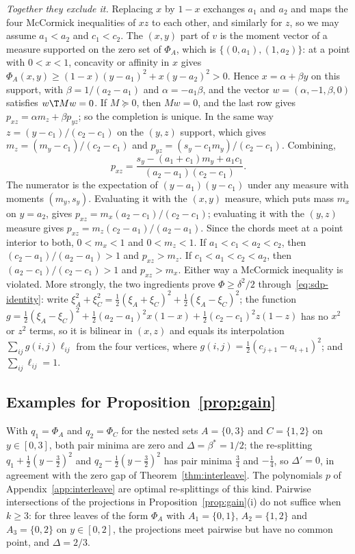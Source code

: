 \emph{Together they exclude it.} Replacing $x$ by $1-x$ exchanges $a_1$ and $a_2$
and maps the four McCormick inequalities of $xz$ to each other, and similarly
for $z$, so we may assume $a_1<a_2$ and $c_1<c_2$. The $(x,y)$ part of $v$ is
the moment vector of a measure supported on the zero set of $\Phi_A$, which is
$\{(0,a_1),(1,a_2)\}$: at a point with $0<x<1$, concavity or affinity in $x$
gives $\Phi_A(x,y)\ge(1-x)(y-a_1)^2+x(y-a_2)^2>0$. Hence $x=\alpha+\beta y$ on this
support, with $\beta=1/(a_2-a_1)$ and $\alpha=-a_1\beta$, and the vector
$w=(\alpha,-1,\beta,0)$ satisfies $w\T Mw=0$. If $M\succeq0$, then $Mw=0$, and the
last row gives $p_{xz}=\alpha m_z+\beta p_{yz}$; so the completion is unique. In
the same way $z=(y-c_1)/(c_2-c_1)$ on the $(y,z)$ support, which gives
$m_z=(m_y-c_1)/(c_2-c_1)$ and $p_{yz}=(s_y-c_1m_y)/(c_2-c_1)$. Combining,
\[
p_{xz}=\frac{s_y-(a_1+c_1)m_y+a_1c_1}{(a_2-a_1)(c_2-c_1)}.
\]
The numerator is the expectation of $(y-a_1)(y-c_1)$ under any measure with
moments $(m_y,s_y)$. Evaluating it with the $(x,y)$ measure, which puts mass
$m_x$ on $y=a_2$, gives $p_{xz}=m_x(a_2-c_1)/(c_2-c_1)$; evaluating it with the
$(y,z)$ measure gives $p_{xz}=m_z(c_2-a_1)/(a_2-a_1)$. Since the chords meet at
a point interior to both, $0<m_x<1$ and $0<m_z<1$. If $a_1<c_1<a_2<c_2$, then
$(c_2-a_1)/(a_2-a_1)>1$ and $p_{xz}>m_z$. If $c_1<a_1<c_2<a_2$, then
$(a_2-c_1)/(c_2-c_1)>1$ and $p_{xz}>m_x$. Either way a McCormick inequality is
violated. More strongly, the two ingredients prove $\Phi\ge\delta^2/2$
through~\eqref{eq:sdp-identity}: write
$\xi_A^2+\xi_C^2=\tfrac12(\xi_A+\xi_C)^2+\tfrac12(\xi_A-\xi_C)^2$; the function
$g=\tfrac12(\xi_A-\xi_C)^2+\tfrac12(a_2-a_1)^2x(1-x)+\tfrac12(c_2-c_1)^2z(1-z)$ has no
$x^2$ or $z^2$ terms, so it is bilinear in $(x,z)$ and equals its interpolation
$\sum_{ij}g(i,j)\ell_{ij}$ from the four vertices, where
$g(i,j)=\tfrac12(c_{j+1}-a_{i+1})^2$; and $\sum_{ij}\ell_{ij}=1$.

\subsection{Examples for Proposition~\ref{prop:gain}}\label{app:gain-examples}

With $q_1=\Phi_A$ and $q_2=\Phi_C$ for the nested sets $A=\{0,3\}$ and
$C=\{1,2\}$ on $y\in[0,3]$, both pair minima are zero and
$\Delta=\beta^\ast=1/2$; the re-splitting $q_1+\tfrac12(y-\tfrac32)^2$ and
$q_2-\tfrac12(y-\tfrac32)^2$ has pair minima $\tfrac34$ and $-\tfrac14$, so
$\Delta'=0$, in agreement with the zero gap of Theorem~\ref{thm:interleave}. The
polynomials $p$ of Appendix~\ref{app:interleave} are optimal re-splittings of
this kind. Pairwise intersections of the projections in
Proposition~\ref{prop:gain}(i) do not suffice when $k\ge3$: for three leaves of
the form $\Phi_A$ with $A_1=\{0,1\}$, $A_2=\{1,2\}$ and $A_3=\{0,2\}$ on
$y\in[0,2]$, the projections meet pairwise but have no common point, and
$\Delta=2/3$.
